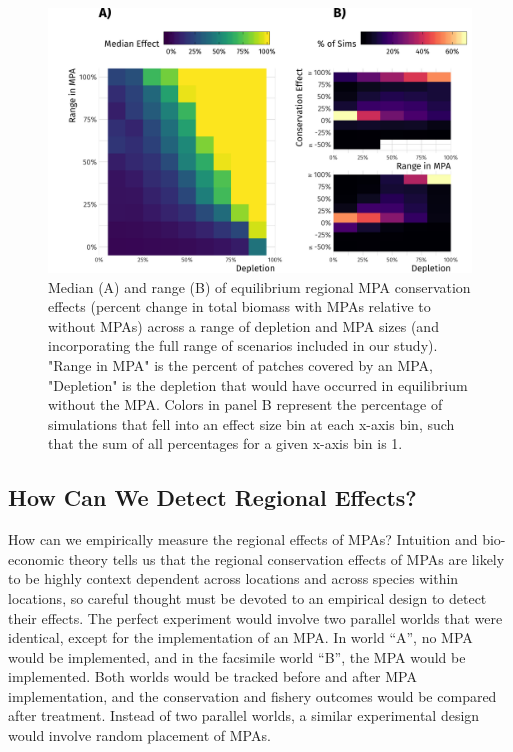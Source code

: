 \documentclass[9pt,twocolumn,twoside,lineno]{pnas-new}
\begin{document}
\begin{figure}%
  \centering
  \includegraphics[width=.9\linewidth]{figs/conservation-effect.png}
  \caption{Median (A) and range (B) of equilibrium regional MPA conservation effects (percent change in total biomass with MPAs relative to without MPAs) across a range of depletion and MPA sizes (and incorporating the full range of scenarios included in our study). "Range in MPA" is the percent of patches covered by an MPA, "Depletion" is the depletion that would have occurred in equilibrium without the MPA. Colors in panel B represent the percentage of simulations that fell into an effect size bin at each x-axis bin, such that the sum of all percentages for a given x-axis bin is 1.}
  \label{conservation-effects}
\end{figure}

\hypertarget{how-can-we-detect-regional-effects}{%
\subsection{How Can We Detect Regional
Effects?}\label{how-can-we-detect-regional-effects}}

How can we empirically measure the regional effects of MPAs? Intuition
and bio-economic theory tells us that the regional conservation effects
of MPAs are likely to be highly context dependent across locations and
across species within locations, so careful thought must be devoted to
an empirical design to detect their effects. The perfect experiment
would involve two parallel worlds that were identical, except for the
implementation of an MPA. In world ``A'', no MPA would be implemented,
and in the facsimile world ``B'', the MPA would be implemented. Both
worlds would be tracked before and after MPA implementation, and the
conservation and fishery outcomes would be compared after treatment.
Instead of two parallel worlds, a similar experimental design would
involve random placement of MPAs.
\end{document}
